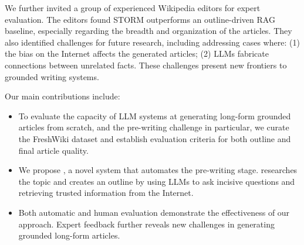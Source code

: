 We further invited a group of experienced Wikipedia editors for expert evaluation. %
The editors found STORM outperforms an outline-driven RAG baseline, especially regarding the breadth and organization of the articles. They also identified %
challenges for future research, including addressing cases where:
(1) the bias %
on the Internet affects the generated articles; (2) LLMs fabricate connections between unrelated facts. 
These challenges present new frontiers to grounded writing systems.


Our main contributions include:
\begin{itemize}
\item {To evaluate the capacity of LLM systems at generating long-form grounded articles from scratch, and the pre-writing challenge in particular, we curate the FreshWiki dataset and establish evaluation criteria for both outline and final article quality.}
\item {We propose \system, a novel system that automates the pre-writing stage. \system researches the topic and creates an outline by using LLMs to ask incisive questions and retrieving trusted information from the Internet.}
\item{Both automatic and human evaluation demonstrate the effectiveness of our approach. Expert feedback further reveals new challenges in generating grounded long-form articles.}


\end{itemize}
